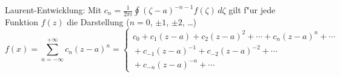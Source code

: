 \documentclass{article}
\begin{document}
\noindent
Laurent-Entwicklung:  Mit $c_n = \frac{1}{2\pi i}
\oint (\zeta-a)^{-n-1}f(\zeta)\,d\zeta$ gilt f"ur jede Funk\-tion $f(z)$ die
Darstellung ($n=0$, $\pm1$, $\pm2$, \ldots)
\[ f(x) = \sum_{n=-\infty}^{+\infty} c_n(z-a)^n
	= \left\{\begin{array}{r}
	  c_0 + c_1(z-a) + c_2(z-a)^2 +\cdots+ c_n(z-a)^n+\cdots\\
	  \mbox{}+c_{-1}(z-a)^{-1} + c_{-2}(z-a)^{-2}+\cdots\\
	  \mbox{}+c_{-n}(z-a)^{-n}+\cdots \end{array}\right. \]
\end{document}
